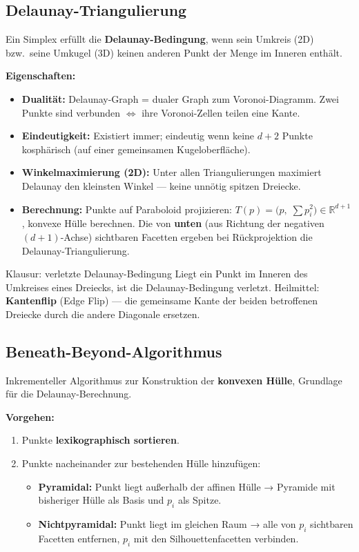 \documentclass[12pt, a4paper]{article}
\begin{document}
\subsection{Delaunay-Triangulierung}

Ein Simplex erfüllt die \textbf{Delaunay-Bedingung}, wenn sein Umkreis (2D) bzw.\ seine Umkugel (3D) keinen anderen Punkt der Menge im Inneren enthält.

\textbf{Eigenschaften:}
\begin{itemize}
  \item \textbf{Dualität:} Delaunay-Graph = dualer Graph zum Voronoi-Diagramm. Zwei Punkte sind verbunden $\Leftrightarrow$ ihre Voronoi-Zellen teilen eine Kante.
  \item \textbf{Eindeutigkeit:} Existiert immer; eindeutig wenn keine $d+2$ Punkte kosphärisch (auf einer gemeinsamen Kugeloberfläche).
  \item \textbf{Winkelmaximierung (2D):} Unter allen Triangulierungen maximiert Delaunay den kleinsten Winkel — keine unnötig spitzen Dreiecke.
  \item \textbf{Berechnung:} Punkte auf Paraboloid projizieren: $T(p) = \bigl(p,\; \textstyle\sum p_i^2\bigr) \in \mathbb{R}^{d+1}$, konvexe Hülle berechnen. Die von \textbf{unten} (aus Richtung der negativen $(d{+}1)$-Achse) sichtbaren Facetten ergeben bei Rückprojektion die Delaunay-Triangulierung.
\end{itemize}

\begin{notebox}{Klausur: verletzte Delaunay-Bedingung}
Liegt ein Punkt im Inneren des Umkreises eines Dreiecks, ist die Delaunay-Bedingung verletzt. Heilmittel: \textbf{Kantenflip} (Edge Flip) — die gemeinsame Kante der beiden betroffenen Dreiecke durch die andere Diagonale ersetzen.
\end{notebox}

\subsection{Beneath-Beyond-Algorithmus}

Inkrementeller Algorithmus zur Konstruktion der \textbf{konvexen Hülle}, Grundlage für die Delaunay-Berechnung.

\textbf{Vorgehen:}
\begin{enumerate}
  \item Punkte \textbf{lexikographisch sortieren}.
  \item Punkte nacheinander zur bestehenden Hülle hinzufügen:
  \begin{itemize}
    \item \textbf{Pyramidal:} Punkt liegt außerhalb der affinen Hülle → Pyramide mit bisheriger Hülle als Basis und $p_i$ als Spitze.
    \item \textbf{Nichtpyramidal:} Punkt liegt im gleichen Raum → alle von $p_i$ sichtbaren Facetten entfernen, $p_i$ mit den Silhouettenfacetten verbinden.
  \end{itemize}
\end{enumerate}
\end{document}
